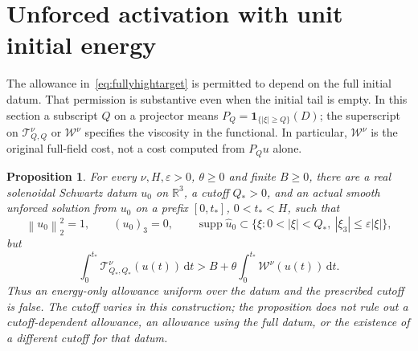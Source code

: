 \documentclass[11pt]{article}
\newtheorem{proposition}{Proposition}
\newcommand{\R}{\mathbb R}
\newcommand{\dd}{\,\mathrm d}
\newcommand{\norm}[1]{\left\lVert#1\right\rVert}
\begin{document}
\section{Unforced activation with unit initial energy}

The allowance in~\eqref{eq:fullyhightarget} is permitted to depend on the
full initial datum. That permission is substantive even when the initial
tail is empty. In this section a subscript $Q$ on a projector means
$P_Q=\mathbf1_{\{|\xi|\geq Q\}}(D)$; the superscript on
$\mathcal T_{Q,Q}^\nu$ or $\mathcal W^\nu$ specifies the viscosity in the
functional. In particular, $\mathcal W^\nu$ is the original full-field
cost, not a cost computed from $P_Qu$ alone.

\begin{proposition}\label{prop:unforcedactivation}
For every $\nu,H,\varepsilon>0$, $\theta\geq0$ and finite $B\geq0$,
there are a real solenoidal Schwartz datum $u_0$ on $\R^3$, a cutoff
$Q_*>0$, and an actual smooth unforced solution from $u_0$ on a prefix
$[0,t_*]$, $0<t_*<H$, such that
\[
 \norm{u_0}_2^2=1,\qquad (u_0)_3=0,\qquad
 \operatorname{supp}\widehat u_0\subset
 \{\xi:0<|\xi|<Q_*,\ |\xi_3|\leq\varepsilon|\xi|\},
\]
but
\begin{equation}\label{eq:activationexcess}
 \int_0^{t_*}\mathcal T_{Q_*,Q_*}^\nu(u(t))\dd t
 > B+\theta\int_0^{t_*}\mathcal W^\nu(u(t))\dd t.
\end{equation}
Thus an energy-only allowance uniform over the datum and the prescribed
cutoff is false. The cutoff varies in this construction; the proposition
does not rule out a cutoff-dependent allowance, an allowance using the
full datum, or the existence of a different cutoff for that datum.
\end{proposition}
\end{document}
